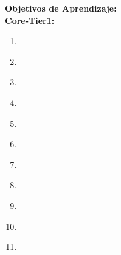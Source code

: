 \noindent \textbf{Objetivos de Aprendizaje:}\\
\noindent \textbf{Core-Tier1:}
\begin{enumerate}
	\setcounter{enumi}{0}
	\item \SDFAlgorithmsandDesignLODiscussTheAlgorithms\xspace[\SDFAlgorithmsandDesignLODiscussTheAlgorithmsLevel]\label{sec:BOK:SDFAlgorithmsandDesignLODiscussTheAlgorithms}
	\item \SDFAlgorithmsandDesignLODiscussHowMay\xspace[\SDFAlgorithmsandDesignLODiscussHowMayLevel]\label{sec:BOK:SDFAlgorithmsandDesignLODiscussHowMay}
	\item \SDFAlgorithmsandDesignLOCreateAlgorithms\xspace[\SDFAlgorithmsandDesignLOCreateAlgorithmsLevel]\label{sec:BOK:SDFAlgorithmsandDesignLOCreateAlgorithms}
	\item \SDFAlgorithmsandDesignLOUseAToAnd\xspace[\SDFAlgorithmsandDesignLOUseAToAndLevel]\label{sec:BOK:SDFAlgorithmsandDesignLOUseAToAnd}
	\item \SDFAlgorithmsandDesignLOImplementTest\xspace[\SDFAlgorithmsandDesignLOImplementTestLevel]\label{sec:BOK:SDFAlgorithmsandDesignLOImplementTest}
	\item \SDFAlgorithmsandDesignLODetermineWhetherOr\xspace[\SDFAlgorithmsandDesignLODetermineWhetherOrLevel]\label{sec:BOK:SDFAlgorithmsandDesignLODetermineWhetherOr}
	\item \SDFAlgorithmsandDesignLOImplementAConquer\xspace[\SDFAlgorithmsandDesignLOImplementAConquerLevel]\label{sec:BOK:SDFAlgorithmsandDesignLOImplementAConquer}
	\item \SDFAlgorithmsandDesignLOApplyTheDecomposition\xspace[\SDFAlgorithmsandDesignLOApplyTheDecompositionLevel]\label{sec:BOK:SDFAlgorithmsandDesignLOApplyTheDecomposition}
	\item \SDFAlgorithmsandDesignLOIdentifyTheAnd\xspace[\SDFAlgorithmsandDesignLOIdentifyTheAndLevel]\label{sec:BOK:SDFAlgorithmsandDesignLOIdentifyTheAnd}
	\item \SDFAlgorithmsandDesignLOImplementAData\xspace[\SDFAlgorithmsandDesignLOImplementADataLevel]\label{sec:BOK:SDFAlgorithmsandDesignLOImplementAData}
	\item \SDFAlgorithmsandDesignLOIdentifyTheAndMultiple\xspace[\SDFAlgorithmsandDesignLOIdentifyTheAndMultipleLevel]\label{sec:BOK:SDFAlgorithmsandDesignLOIdentifyTheAndMultiple}
\end{enumerate}


